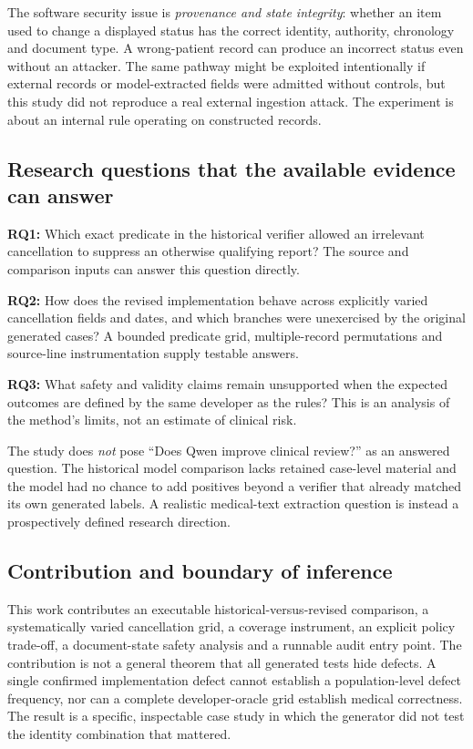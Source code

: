 \documentclass[11pt,twocolumn]{article}
\begin{document}
The software security issue is \emph{provenance and state integrity}: whether an item used to change a displayed status has the correct identity, authority, chronology and document type. A wrong-patient record can produce an incorrect status even without an attacker. The same pathway might be exploited intentionally if external records or model-extracted fields were admitted without controls, but this study did not reproduce a real external ingestion attack. The experiment is about an internal rule operating on constructed records.

\subsection{Research questions that the available evidence can answer}
\textbf{RQ1:} Which exact predicate in the historical verifier allowed an irrelevant cancellation to suppress an otherwise qualifying report? The source and comparison inputs can answer this question directly.

\textbf{RQ2:} How does the revised implementation behave across explicitly varied cancellation fields and dates, and which branches were unexercised by the original generated cases? A bounded predicate grid, multiple-record permutations and source-line instrumentation supply testable answers.

\textbf{RQ3:} What safety and validity claims remain unsupported when the expected outcomes are defined by the same developer as the rules? This is an analysis of the method's limits, not an estimate of clinical risk.

The study does \emph{not} pose ``Does Qwen improve clinical review?'' as an answered question. The historical model comparison lacks retained case-level material and the model had no chance to add positives beyond a verifier that already matched its own generated labels. A realistic medical-text extraction question is instead a prospectively defined research direction.

\subsection{Contribution and boundary of inference}
This work contributes an executable historical-versus-revised comparison, a systematically varied cancellation grid, a coverage instrument, an explicit policy trade-off, a document-state safety analysis and a runnable audit entry point. The contribution is not a general theorem that all generated tests hide defects. A single confirmed implementation defect cannot establish a population-level defect frequency, nor can a complete developer-oracle grid establish medical correctness. The result is a specific, inspectable case study in which the generator did not test the identity combination that mattered.
\end{document}
